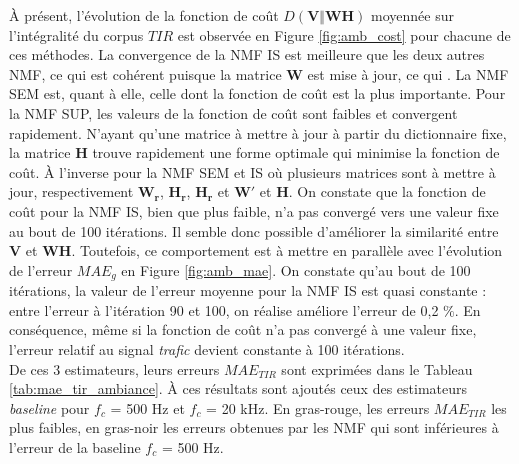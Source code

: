 À présent, l'évolution de la fonction de coût $D(\mathbf{V}\Vert \mathbf{WH})$ moyennée sur l'intégralité du corpus  $TIR$ est observée en Figure \ref{fig:amb_cost} pour chacune de ces méthodes. La convergence de la NMF IS est meilleure que les deux autres NMF, ce qui est cohérent puisque la matrice $\mathbf{W}$ est mise à jour, ce qui . La NMF SEM est, quant à elle, celle dont la fonction de coût est la plus importante. Pour la NMF SUP, les valeurs de la fonction de coût sont faibles et convergent rapidement. N'ayant qu'une matrice à mettre à jour à partir du dictionnaire fixe, la matrice $\mathbf{H}$ trouve rapidement une forme optimale qui minimise la fonction de coût. À l'inverse pour la NMF SEM et IS où plusieurs matrices sont à mettre à jour, respectivement $\mathbf{W_r}$, $\mathbf{H_r}$, $\mathbf{H_r}$ et $\mathbf{W'}$ et $\mathbf{H}$. On constate que la fonction de coût pour la NMF IS, bien que plus faible, n'a pas convergé vers une valeur fixe au bout de 100 itérations. Il semble donc possible d'améliorer la similarité entre $\mathbf{V}$ et $\mathbf{WH}$. Toutefois, ce comportement est à mettre en parallèle avec l'évolution de l'erreur $MAE_g$ en Figure \ref{fig:amb_mae}. On constate qu'au bout de 100 itérations, la valeur de l'erreur moyenne pour la NMF IS est quasi constante : entre l'erreur à l'itération 90 et 100, on réalise améliore l'erreur de 0,2 $\%$. En conséquence, même si la fonction de coût n'a pas convergé à une valeur fixe, l'erreur relatif au signal \textit{trafic} devient constante à 100 itérations.\\

De ces 3 estimateurs, leurs erreurs $MAE_{TIR}$ sont exprimées dans le Tableau \ref{tab:mae_tir_ambiance}. À ces résultats sont ajoutés ceux des estimateurs \textit{baseline} pour $f_c$ = 500 Hz et $f_c$ = 20 kHz. En gras-rouge, les erreurs $MAE_{TIR}$ les plus faibles, en gras-noir les erreurs obtenues par les NMF qui sont inférieures à l'erreur de la baseline $f_c$ = 500 Hz.\\

